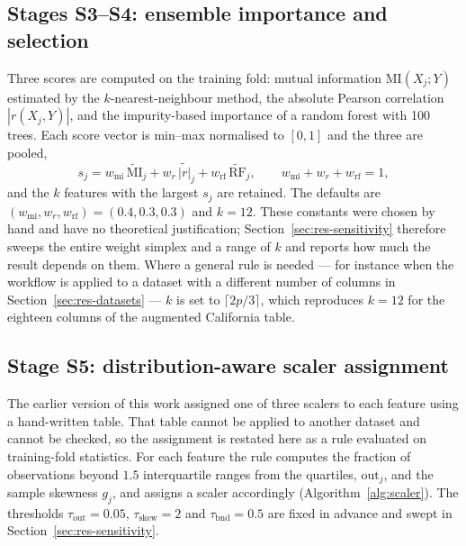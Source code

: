 \documentclass[pdflatex,sn-mathphys-num]{sn-jnl}
\begin{document}
\subsection{Stages S3--S4: ensemble importance and selection}\label{sec:selection}
Three scores are computed on the training fold: mutual information $\mathrm{MI}(X_j; Y)$ estimated by the $k$-nearest-neighbour method, the absolute Pearson correlation $|r(X_j, Y)|$, and the impurity-based importance of a random forest \cite{breiman2001} with 100 trees. Each score vector is min--max normalised to $[0,1]$ and the three are pooled,
\begin{equation}
s_j = w_{\text{mi}} \, \widetilde{\mathrm{MI}}_j + w_{r} \, \widetilde{|r|}_j + w_{\text{rf}} \, \widetilde{\mathrm{RF}}_j ,
\qquad w_{\text{mi}} + w_{r} + w_{\text{rf}} = 1 ,
\label{eq:ensemble}
\end{equation}
and the $k$ features with the largest $s_j$ are retained. The defaults are $(w_{\text{mi}}, w_{r}, w_{\text{rf}}) = (0.4, 0.3, 0.3)$ and $k = 12$. These constants were chosen by hand and have no theoretical justification; Section~\ref{sec:res-sensitivity} therefore sweeps the entire weight simplex and a range of $k$ and reports how much the result depends on them. Where a general rule is needed --- for instance when the workflow is applied to a dataset with a different number of columns in Section~\ref{sec:res-datasets} --- $k$ is set to $\lceil 2p/3 \rceil$, which reproduces $k = 12$ for the eighteen columns of the augmented California table.

\subsection{Stage S5: distribution-aware scaler assignment}\label{sec:scaler}
The earlier version of this work assigned one of three scalers to each feature using a hand-written table. That table cannot be applied to another dataset and cannot be checked, so the assignment is restated here as a rule evaluated on training-fold statistics. For each feature the rule computes the fraction of observations beyond $1.5$ interquartile ranges from the quartiles, $\mathrm{out}_j$, and the sample skewness $g_j$, and assigns a scaler accordingly (Algorithm~\ref{alg:scaler}). The thresholds $\tau_{\text{out}} = 0.05$, $\tau_{\text{skew}} = 2$ and $\tau_{\text{bnd}} = 0.5$ are fixed in advance and swept in Section~\ref{sec:res-sensitivity}.
\end{document}
